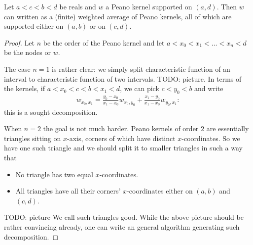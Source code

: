 \begin{lem}\label{peano_splitting_theorem}
	Let $a < c < b < d$ be reals and $w$ a Peano kernel supported on $(a, d)$. Then $w$ can written as a (finite) weighted average of Peano kernels, all of which are supported either on $(a, b)$ or on $(c, d)$.
\end{lem}
\begin{proof}
	Let $n$ be the order of the Peano kernel and let $a < x_{0} < x_{1} < \ldots < x_{n} < d$ be the nodes or $w$.

	The case $n = 1$ is rather clear: we simply split characteristic function of an interval to characteristic function of two intervals. TODO: picture. In terms of the kernels, if $a < x_{0} < c < b < x_{1} < d$, we can pick $c < y_{0} < b$ and write
	\begin{align*}
		w_{x_{0}, x_{1}} = \frac{y_{0} - x_{0}}{x_{1} - x_{0}} w_{x_{0}, y_{0}} + \frac{x_{1} - y_{0}}{x_{1} - x_{0}} w_{y_{0}, x_{1}}:
	\end{align*}
	this is a sought decomposition.

	When $n = 2$ the goal is not much harder. Peano kernels of order $2$ are essentially triangles sitting on $x$-axis, corners of which have distinct $x$-coordinates. So we have one such triangle and we should split it to smaller triangles in such a way that

	\begin{itemize}
		\item No triangle has two equal $x$-coordinates.
		\item All triangles have all their corners' $x$-coordinates either on $(a, b)$ and $(c, d)$.
	\end{itemize}
	TODO: picture
	We call such triangles good. While the above picture should be rather convincing already, one can write an general algorithm generating such decomposition.


\end{proof}
